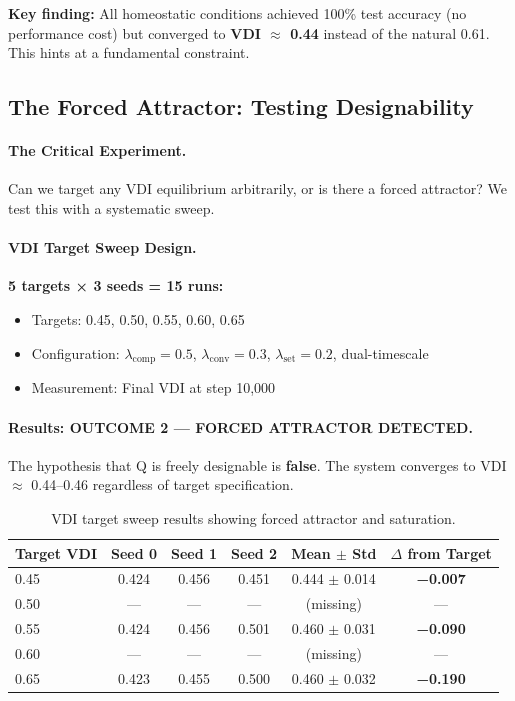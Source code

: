 \textbf{Key finding:} All homeostatic conditions achieved 100\% test accuracy (no performance cost) but converged to \textbf{VDI $\approx$ 0.44} instead of the natural 0.61. This hints at a fundamental constraint.

\subsection{The Forced Attractor: Testing Designability}

\paragraph{The Critical Experiment.}
Can we target any VDI equilibrium arbitrarily, or is there a forced attractor? We test this with a systematic sweep.

\paragraph{VDI Target Sweep Design.}
\textbf{5 targets × 3 seeds = 15 runs:}
\begin{itemize}
\item Targets: 0.45, 0.50, 0.55, 0.60, 0.65
\item Configuration: $\lambda_{\text{comp}}=0.5$, $\lambda_{\text{conv}}=0.3$, $\lambda_{\text{set}}=0.2$, dual-timescale
\item Measurement: Final VDI at step 10,000
\end{itemize}

\paragraph{Results: OUTCOME 2 — FORCED ATTRACTOR DETECTED.}

The hypothesis that Q is freely designable is \textbf{false}. The system converges to VDI $\approx$ 0.44--0.46 regardless of target specification.

\begin{table}[h]
\centering
\caption{VDI target sweep results showing forced attractor and saturation.}
\label{tab:vdi-sweep}
\begin{tabular}{lccccc}
\toprule
Target VDI & Seed 0 & Seed 1 & Seed 2 & Mean $\pm$ Std & $\Delta$ from Target \\
\midrule
0.45 & 0.424 & 0.456 & 0.451 & 0.444 $\pm$ 0.014 & \textbf{−0.007} \\
0.50 & — & — & — & (missing) & — \\
0.55 & 0.424 & 0.456 & 0.501 & 0.460 $\pm$ 0.031 & \textbf{−0.090} \\
0.60 & — & — & — & (missing) & — \\
0.65 & 0.423 & 0.455 & 0.500 & 0.460 $\pm$ 0.032 & \textbf{−0.190} \\
\bottomrule
\end{tabular}
\end{table}

